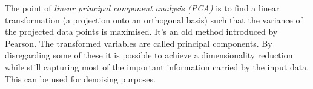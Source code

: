 

The point of \textit{linear principal component analysis (PCA)} is to find a linear transformation (a projection onto an orthogonal basis) such that the variance of the projected data points is maximised. It's an old method introduced by Pearson. The transformed variables are called principal components. By disregarding some of these it is possible to achieve a dimensionality reduction while still capturing most of the important information carried by the input data. This can be used for denoising purposes.

\begin{figure}[h]
\centering
%
\\
%
\quad
{}\quad
{}\\

\end{figure}
